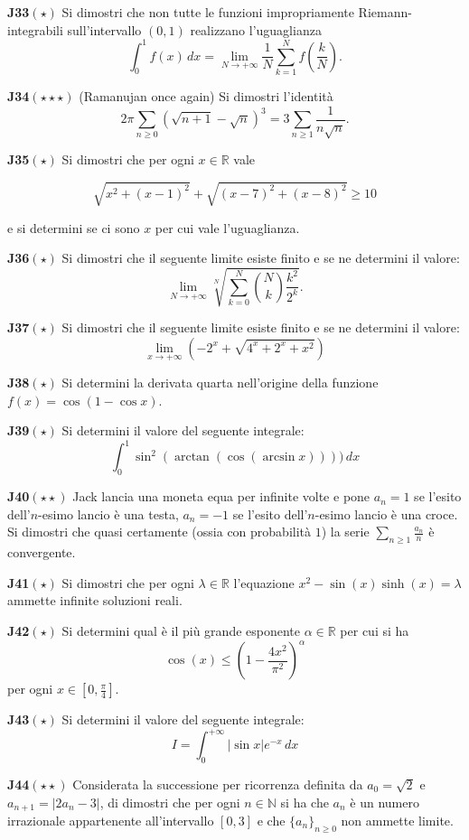 \documentclass[a4paper,twoside]{article}
\theoremstyle{definition}
\numberwithin{theorem}{section}
\begin{document}
\textbf{J33}$(\star)$ Si dimostri che non tutte le funzioni impropriamente Riemann-integrabili sull'intervallo $(0,1)$ realizzano l'uguaglianza
$$ \int_{0}^{1}f(x)\,dx = \lim_{N\to +\infty}\frac{1}{N}\sum_{k=1}^{N}f\left(\frac{k}{N}\right).$$

\textbf{J34}$(\star\star\star)$ (Ramanujan once again) Si dimostri l'identità
$$ 2\pi\sum_{n\geq 0}\left(\sqrt{n+1}-\sqrt{n}\right)^3 = 3\sum_{n\geq 1}\frac{1}{n\sqrt{n}}.$$

\textbf{J35}$(\star)$ Si dimostri che per ogni $x\in\mathbb{R}$ vale

$$ \sqrt{x^2+(x-1)^2}+\sqrt{(x-7)^2+(x-8)^2}\geq 10 $$

e si determini se ci sono $x$ per cui vale l'uguaglianza.

\textbf{J36}$(\star)$ Si dimostri che il seguente limite esiste finito e se ne determini il valore:
$$ \lim_{N\to +\infty}\sqrt[N]{\sum_{k=0}^{N}\binom{N}{k}\frac{k^2}{2^k}}.$$

\textbf{J37}$(\star)$ Si dimostri che il seguente limite esiste finito e se ne determini il valore:
$$ \lim_{x\to +\infty} \left(-2^x+\sqrt{4^x+2^x+x^2}\right) $$

\textbf{J38}$(\star)$ Si determini la derivata quarta nell'origine della funzione $f(x)=\cos(1-\cos x)$.

\textbf{J39}$(\star)$ Si determini il valore del seguente integrale:
$$ \int_{0}^{1}\sin^2(\arctan(\cos(\arcsin x))))\,dx $$ 

\textbf{J40}$(\star\star)$ Jack lancia una moneta equa per infinite volte e pone $a_n=1$ se l'esito dell'$n$-esimo lancio è una testa, $a_n=-1$ se l'esito dell'$n$-esimo lancio è una croce. Si dimostri che quasi certamente (ossia con probabilità $1$) la serie $\sum_{n\geq 1}\frac{a_n}{n}$ è convergente.

\textbf{J41}$(\star)$ Si dimostri che per ogni $\lambda\in\mathbb{R}$ l'equazione $x^2-\sin(x)\sinh(x)=\lambda$ ammette infinite soluzioni reali.

\textbf{J42}$(\star)$ Si determini qual è il più grande esponente $\alpha\in\mathbb{R}$ per cui si ha
$$ \cos(x)\leq\left(1-\frac{4x^2}{\pi^2}\right)^\alpha $$
per ogni $x\in\left[0,\frac{\pi}{4}\right]$.

\textbf{J43}$(\star)$ Si determini il valore del seguente integrale:
$$ I=\int_{0}^{+\infty}\left|\sin x\right| e^{-x}\,dx $$

\textbf{J44}$(\star\star)$ Considerata la successione per ricorrenza definita da $a_0=\sqrt{2}$ e $a_{n+1}=|2a_n-3|$, di dimostri che per ogni $n\in\mathbb{N}$ si ha che $a_n$ è un numero irrazionale appartenente all'intervallo $[0,3]$ e che $\{a_n\}_{n\geq 0}$ non ammette limite.
\end{document}
